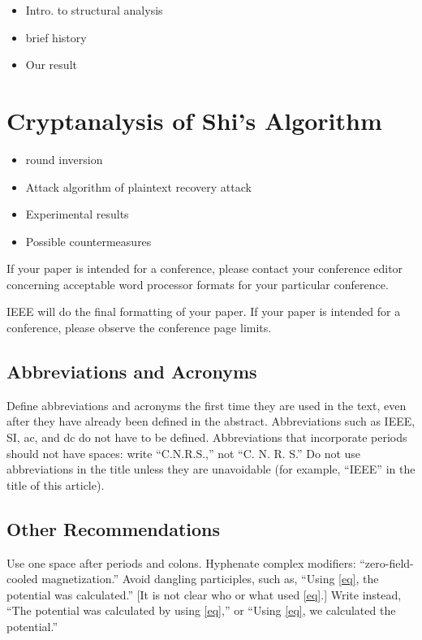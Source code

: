 \documentclass{ieeeaccess}
\begin{document}
\begin{itemize}
\item Intro. to structural analysis
\item brief history
\item Our result
\end{itemize}

\section{Cryptanalysis of Shi's Algorithm}

\begin{itemize}
\item round inversion
\item Attack algorithm of plaintext recovery attack
\item Experimental results
\item Possible countermeasures
\end{itemize}




If your paper is intended for a conference, please contact your conference 
editor concerning acceptable word processor formats for your particular 
conference. 

IEEE will do the final formatting of your paper. If your paper is intended 
for a conference, please observe the conference page limits. 

\subsection{Abbreviations and Acronyms}
Define abbreviations and acronyms the first time they are used in the text, 
even after they have already been defined in the abstract. Abbreviations 
such as IEEE, SI, ac, and dc do not have to be defined. Abbreviations that 
incorporate periods should not have spaces: write ``C.N.R.S.,'' not ``C. N. 
R. S.'' Do not use abbreviations in the title unless they are unavoidable 
(for example, ``IEEE'' in the title of this article).

\subsection{Other Recommendations}
Use one space after periods and colons. Hyphenate complex modifiers: 
``zero-field-cooled magnetization.'' Avoid dangling participles, such as, 
``Using \eqref{eq}, the potential was calculated.'' [It is not clear who or what 
used \eqref{eq}.] Write instead, ``The potential was calculated by using \eqref{eq},'' or 
``Using \eqref{eq}, we calculated the potential.''
\end{document}
